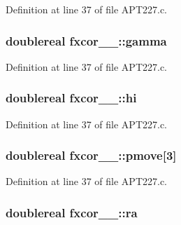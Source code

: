 Definition at line 37 of file A\+P\+T227.\+c.

\subsubsection[{\texorpdfstring{gamma}{gamma}}]{\setlength{\rightskip}{0pt plus 5cm}doublereal fxcor\+\_\+\_\+\+::gamma}\hypertarget{structfxcor__1___ad97ee657cb98f2344103d8541ca06669}{}\label{structfxcor__1___ad97ee657cb98f2344103d8541ca06669}


Definition at line 37 of file A\+P\+T227.\+c.

\subsubsection[{\texorpdfstring{hi}{hi}}]{\setlength{\rightskip}{0pt plus 5cm}doublereal fxcor\+\_\+\_\+\+::hi}\hypertarget{structfxcor__1___a501f06f64dd42d14c52a160780b8840f}{}\label{structfxcor__1___a501f06f64dd42d14c52a160780b8840f}


Definition at line 37 of file A\+P\+T227.\+c.

\subsubsection[{\texorpdfstring{pmove}{pmove}}]{\setlength{\rightskip}{0pt plus 5cm}doublereal fxcor\+\_\+\_\+\+::pmove\mbox{[}3\mbox{]}}\hypertarget{structfxcor__1___a6aeeee56deebedb279a4c347c18445d4}{}\label{structfxcor__1___a6aeeee56deebedb279a4c347c18445d4}


Definition at line 37 of file A\+P\+T227.\+c.

\subsubsection[{\texorpdfstring{ra}{ra}}]{\setlength{\rightskip}{0pt plus 5cm}doublereal fxcor\+\_\+\_\+\+::ra}\hypertarget{structfxcor__1___aad8a836801c5c25cffee45a3f75e00f9}{}\label{structfxcor__1___aad8a836801c5c25cffee45a3f75e00f9}



